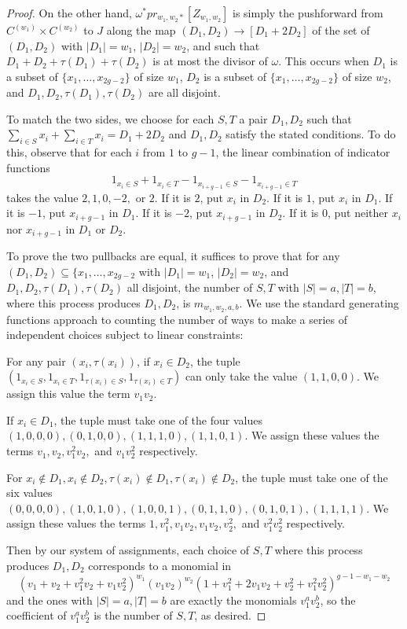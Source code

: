 \documentclass[12pt]{amsart}
\theoremstyle{definition}
\theoremstyle{remark}
\begin{document}
\begin{proof}
On the other hand, $\omega^*  pr_{w_1,w_2 *} [ Z_{w_1,w_2} ]$ is simply the pushforward from $C^{(w_1) } \times C^{(w_2)}$ to $J$ along the map $(D_1,D_2) \to [D_1+2D_2]$ of the set of $(D_1,D_2)$ with $|D_1|=w_1$, $|D_2|=w_2$, and such that $ D_1 + D_2 + \tau(D_1) + \tau(D_2)$ is at most the divisor of $\omega$.  This occurs when $D_1$ is a subset of $\{x_1,\dots, x_{2g-2}\}$ of size $w_1$, $D_2$ is a subset of  $\{x_1,\dots, x_{2g-2}\}$ of size $w_2$, and $D_1, D_2, \tau(D_1), \tau(D_2)$ are all disjoint. 

To match the two sides, we choose for each $S, T$ a pair $D_1, D_2$ such that $ \sum_{i \in S} x_i + \sum_{ i \in T} x_i  = D_1 + 2D_2$ and $D_1, D_2$ satisfy the stated conditions. To do this, observe that for each $i$ from $1$ to $g-1$, the linear combination of indicator functions
\[ 1_{ x_i \in S}+ 1_{x_i \in T} - 1_{x_{i+g-1} \in S} -1_{x_{i+g-1} \in T}\] takes the value $2, 1,0,-2,$ or $2$. If it is $2$, put $x_i$ in $D_2$. If it is $1$, put $x_i$ in $D_1$. If it is $-1$, put $x_{i+g-1}$ in $D_1$. If it is $-2$, put $x_{i+g-1}$ in $D_2$. If it is $0$, put neither $x_{i}$ nor $x_{i+g-1}$ in $D_1$ or $D_2$.

To prove the two pullbacks are equal, it suffices to prove that for any $(D_1,D_2)\subseteq \{x_1,\dots,x_{2g-2} $ with  $|D_1|=w_1$, $|D_2|=w_2$, and $D_1,D_2,\tau(D_1), \tau(D_2)$ all disjoint, the number of $S,T$ with $|S|=a, |T|=b$, where this process produces $D_1,D_2$, is $m_{w_1,w_2,a,b}$.  We use the standard generating functions approach to counting the number of ways to make a series of independent choices subject to linear constraints:

For any pair $(x_i,\tau(x_i))$, if $x_i \in D_2$, the tuple $(1_{x_i\in S}, 1_{x_i \in T}, 1_{\tau(x_i) \in S}, 1_{\tau(x_i)\in T})$ can only take the value $(1,1,0,0)$. We assign this value the term $v_1v_2$.

If $x_i \in D_1$, the tuple must take one of the four values $(1,0,0,0), (0,1,0,0), (1,1,1,0),(1,1,0,1)$. We assign these values the terms $v_1,v_2,v_1^2 v_2, $ and $v_1v_2^2$ respectively.

For $x_i \not \in D_1,x_i \not\in D_2, \tau(x_i)\not\in D_1, \tau(x_i)\not\in D_2$, the tuple must take one of the six values $(0,0,0,0),(1,0,1,0), (1,0,0,1),(0,1,1,0),(0,1,0,1),(1,1,1,1)$. We assign these values the terms $1,v_1^2, v_1v_2,v_1v_2, v_2^2,$ and $v_1^2v_2^2$ respectively.

Then by our system of assignments, each choice of $S,T$ where this process produces $D_1,D_2$ corresponds to a monomial in \[ (v_1+ v_2+ v_1^2 v_2 + v_1 v_2^2 )^{w_1} (v_1v_2)^{w_2} ( 1  + v_1^2 + 2v_1 v_2 + v_2^2 + v_1^2 v_2^2 )^{g-1-w_1 -w_2} \] and the ones with $|S| = a, |T|=b$ are exactly the monomials $v_1^a v_2^b$, so the coefficient of $v_1^a v_2^b$ is the number of $S,T$, as desired.


\end{proof}
\end{document}

